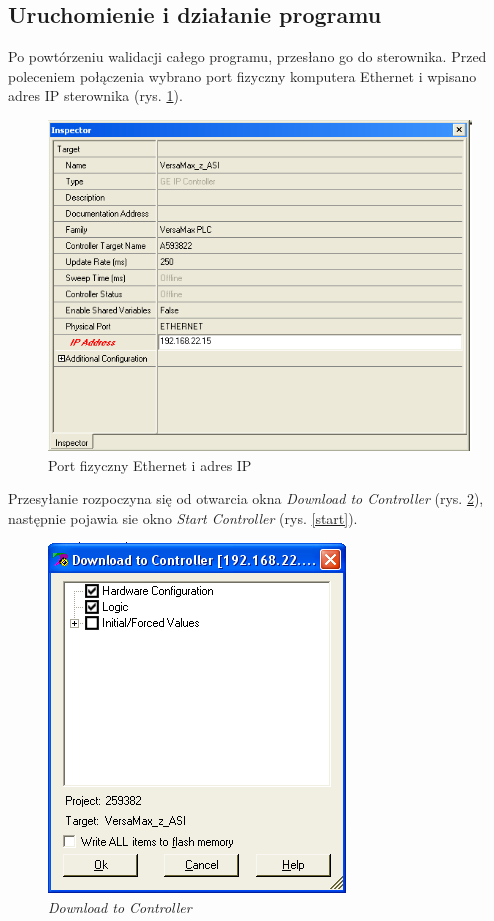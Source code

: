 \documentclass[12pt]{article}
\begin{document}
\subsection{Uruchomienie i działanie programu}
Po powtórzeniu walidacji całego programu, przesłano go do sterownika. Przed poleceniem połączenia wybrano port fizyczny komputera Ethernet i wpisano adres IP sterownika (rys. \ref{inspector}).
\begin{figure}[H]
    \centering
    \includegraphics[scale=0.7]{./zdj/inspector}
    \caption{Port fizyczny Ethernet i adres IP}
    \label{inspector}
\end{figure}
Przesyłanie rozpoczyna się od otwarcia okna \textit{Download to Controller} (rys. \ref{download}), następnie pojawia sie okno \textit{Start Controller} (rys. \ref{start}).
\begin{figure}[H]
    \centering
    \includegraphics[scale=0.75]{./zdj/download.png}
    \caption{\textit{Download to Controller}}
    \label{download}
\end{figure}
\end{document}
